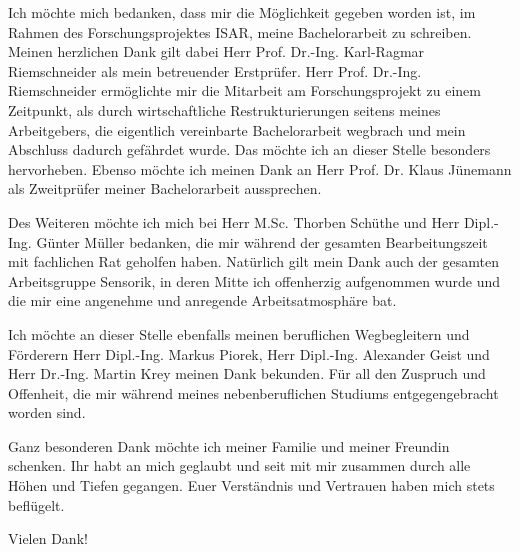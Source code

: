 \begin{minipage}{\textwidth}
Ich möchte mich bedanken, dass mir die Möglichkeit gegeben worden ist, im Rahmen des Forschungsprojektes ISAR, meine Bachelorarbeit zu schreiben. Meinen herzlichen Dank gilt dabei Herr Prof. Dr.-Ing. Karl-Ragmar Riemschneider als mein betreuender Erstprüfer. Herr Prof. Dr.-Ing. Riemschneider ermöglichte mir die Mitarbeit am Forschungsprojekt zu einem Zeitpunkt, als durch wirtschaftliche Restrukturierungen seitens meines Arbeitgebers, die eigentlich vereinbarte Bachelorarbeit wegbrach und mein Abschluss dadurch gefährdet wurde. Das möchte ich an dieser Stelle besonders hervorheben. Ebenso möchte ich meinen Dank an Herr Prof. Dr. Klaus Jünemann als Zweitprüfer meiner Bachelorarbeit aussprechen.
\newline


Des Weiteren möchte ich mich bei Herr M.Sc. Thorben Schüthe und Herr Dipl.-Ing. Günter Müller bedanken, die mir während der gesamten Bearbeitungszeit mit fachlichen Rat geholfen haben. Natürlich gilt mein Dank auch der gesamten Arbeitsgruppe Sensorik, in deren Mitte ich offenherzig aufgenommen wurde und die mir eine angenehme und anregende Arbeitsatmosphäre bat.
\newline


Ich möchte an dieser Stelle ebenfalls meinen beruflichen Wegbegleitern und Förderern Herr Dipl.-Ing. Markus Piorek, Herr Dipl.-Ing. Alexander Geist und Herr Dr.-Ing. Martin Krey meinen Dank bekunden. Für all den Zuspruch und Offenheit, die mir während meines nebenberuflichen Studiums entgegengebracht worden sind.
\newline


Ganz besonderen Dank möchte ich meiner Familie und meiner Freundin schenken. Ihr habt an mich geglaubt und seit mit mir zusammen durch alle Höhen und Tiefen gegangen. Euer Verständnis und Vertrauen haben mich stets beflügelt.
\newline


Vielen Dank!
\end{minipage}